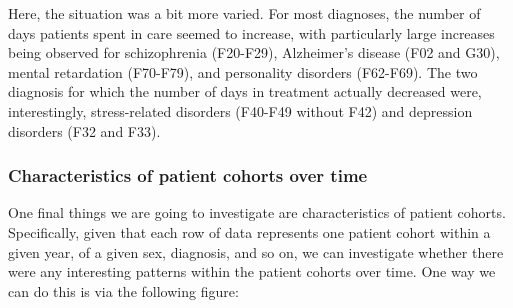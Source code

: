 \documentclass[
]{book}
\newenvironment{Shaded}{\begin{snugshade}}{\end{snugshade}}
\newcommand{\AttributeTok}[1]{\textcolor[rgb]{0.13,0.29,0.53}{#1}}
\newcommand{\DecValTok}[1]{\textcolor[rgb]{0.00,0.00,0.81}{#1}}
\newcommand{\FunctionTok}[1]{\textcolor[rgb]{0.13,0.29,0.53}{\textbf{#1}}}
\newcommand{\NormalTok}[1]{#1}
\newcommand{\SpecialCharTok}[1]{\textcolor[rgb]{0.81,0.36,0.00}{\textbf{#1}}}
\newcommand{\StringTok}[1]{\textcolor[rgb]{0.31,0.60,0.02}{#1}}
\theoremstyle{definition}
\theoremstyle{definition}
\theoremstyle{definition}
\theoremstyle{definition}
\theoremstyle{remark}
\begin{document}
Here, the situation was a bit more varied. For most diagnoses, the number of days patients spent in care seemed to increase, with particularly large increases being observed for schizophrenia (F20-F29), Alzheimer's disease (F02 and G30), mental retardation (F70-F79), and personality disorders (F62-F69). The two diagnosis for which the number of days in treatment actually decreased were, interestingly, stress-related disorders (F40-F49 without F42) and depression disorders (F32 and F33).

\subsubsection{Characteristics of patient cohorts over time}\label{characteristics-of-patient-cohorts-over-time}

One final things we are going to investigate are characteristics of patient cohorts. Specifically, given that each row of data represents one patient cohort within a given year, of a given sex, diagnosis, and so on, we can investigate whether there were any interesting patterns within the patient cohorts over time. One way we can do this is via the following figure:

\begin{Shaded}
\end{Shaded}
\end{document}
